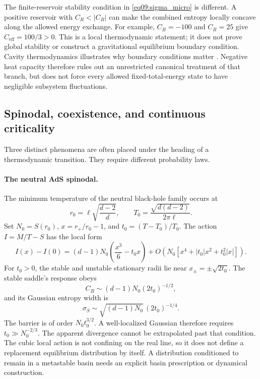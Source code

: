 \documentclass[11pt,letterpaper]{article}
\theoremstyle{plain}
\theoremstyle{definition}
\theoremstyle{remark}
\begin{document}
The finite-reservoir stability condition in \eqref{eq09:sigma_micro} is
different. A positive reservoir with $C_R<|C_B|$ can make the combined entropy
locally concave along the allowed energy exchange. For example,
$C_B=-100$ and $C_R=25$ give $C_{\mathrm{eff}}=100/3>0$.
This is a local thermodynamic statement; it does not prove global stability
or construct a gravitational equilibrium boundary condition. Cavity
thermodynamics illustrates why boundary conditions matter
\citep{york1986}. Negative heat capacity therefore rules out an unrestricted
canonical treatment of that branch, but does not force every allowed
fixed-total-energy state to have negligible subsystem fluctuations.

\subsection{Spinodal, coexistence, and continuous criticality}
\label{subsec09:critical_phenomena}

Three distinct phenomena are often placed under the heading of a
thermodynamic transition. They require different probability laws.

\paragraph{The neutral AdS spinodal.}
The minimum temperature of the neutral black-hole family occurs at
\begin{equation}
 r_0=\ell\sqrt{\frac{d-2}{d}},\qquad
 T_0=\frac{\sqrt{d(d-2)}}{2\pi\ell}.
 \label{eq09:spinodal_location}
\end{equation}
Set $N_0=S(r_0)$, $x=r_+/r_0-1$, and $t_0=(T-T_0)/T_0$.
The action $I=M/T-S$ has the local form
\begin{equation}
 I(x)-I(0)
 =(d-1)N_0\left(\frac{x^3}{6}-t_0x\right)
 +O\!\left(N_0[x^4+|t_0|x^2+t_0^2|x|]\right).
 \label{eq09:spinodal_action}
\end{equation}
For $t_0>0$, the stable and unstable stationary radii lie near
$x_\pm=\pm\sqrt{2t_0}$. The stable saddle's response obeys
\begin{equation}
 C_B\sim(d-1)N_0(2t_0)^{-1/2},
 \label{eq09:cv_hp}
\end{equation}
and its Gaussian entropy width is
\begin{equation}
 \sigma_S\sim\sqrt{(d-1)N_0}\,(2t_0)^{-1/4}.
 \label{eq09:sigma_hp}
\end{equation}
The barrier is of order $N_0t_0^{3/2}$. A well-localized Gaussian therefore
requires $t_0\gg N_0^{-2/3}$. The apparent divergence cannot be extrapolated
past that condition. The cubic local action is not confining on the real
line, so it does not define a replacement equilibrium distribution by itself.
A distribution conditioned to remain in a metastable basin needs an explicit
basin prescription or dynamical construction.
\end{document}
